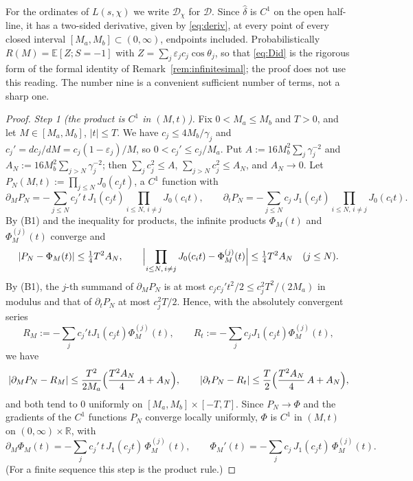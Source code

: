 \documentclass[11pt]{amsart}
\theoremstyle{definition}
\numberwithin{equation}{section}
\newcommand{\eps}{\varepsilon}
\newcommand{\EE}{\mathbb E}
\newcommand{\hd}{\widehat\delta}
\begin{document}
For the ordinates of $L(s,\chi)$ we write $\mathcal D_\chi$ for
$\mathcal D$. Since $\hd$ is $C^1$ on the open half-line, it has a
two-sided derivative, given by \eqref{eq:deriv}, at every point of
every closed interval $[M_a,M_b]\subset(0,\infty)$, endpoints
included. Probabilistically $R(M)=\EE[Z;S=-1]$ with
$Z=\sum_j\eps_jc_j\cos\theta_j$, so that \eqref{eq:Did} is the
rigorous form of the formal identity of
Remark~\ref{rem:infinitesimal}; the proof does not use this reading.
The number nine is a convenient sufficient number of terms, not a
sharp one.

\begin{proof}
\emph{Step 1 (the product is $C^1$ in $(M,t)$).} Fix $0<M_a\le M_b$
and $T>0$, and let $M\in[M_a,M_b]$, $|t|\le T$. We have
$c_j\le4M_b/\gamma_j$ and $c_j'=dc_j/dM=c_j(1-\eps_j)/M$, so
$0<c_j'\le c_j/M_a$. Put $A:=16M_b^2\sum_j\gamma_j^{-2}$ and
$A_N:=16M_b^2\sum_{j>N}\gamma_j^{-2}$; then $\sum_jc_j^2\le A$,
$\sum_{j>N}c_j^2\le A_N$, and $A_N\to0$. Let
$P_N(M,t):=\prod_{j\le N}J_0(c_jt)$, a $C^1$ function with
\[
\partial_MP_N=-\sum_{j\le N}c_j'\,t\,J_1(c_jt)\!\!\prod_{i\le N,\,i\ne j}\!\!J_0(c_it),
\qquad
\partial_tP_N=-\sum_{j\le N}c_j\,J_1(c_jt)\!\!\prod_{i\le N,\,i\ne j}\!\!J_0(c_it).
\]
By (B1) and the inequality for products, the infinite products
$\Phi_M(t)$ and $\Phi^{(j)}_M(t)$ converge and
\[
|P_N-\Phi_M(t)|\le\tfrac14T^2A_N,\qquad
\Bigl|\prod_{i\le N,\,i\ne j}J_0(c_it)-\Phi_M^{(j)}(t)\Bigr|\le\tfrac14T^2A_N
\quad(j\le N).
\]
By (B1), the $j$-th summand of $\partial_MP_N$ is at most
$c_jc_j't^2/2\le c_j^2T^2/(2M_a)$ in modulus and that of
$\partial_tP_N$ at most $c_j^2T/2$. Hence, with the absolutely
convergent series
\[
R_M:=-\sum_jc_j'tJ_1(c_jt)\Phi^{(j)}_M(t),\qquad
R_t:=-\sum_jc_jJ_1(c_jt)\Phi^{(j)}_M(t),
\]
we have
\[
|\partial_MP_N-R_M|\le\frac{T^2}{2M_a}\Bigl(\frac{T^2A_N}{4}\,A+A_N\Bigr),
\qquad
|\partial_tP_N-R_t|\le\frac{T}{2}\Bigl(\frac{T^2A_N}{4}\,A+A_N\Bigr),
\]
and both tend to $0$ uniformly on $[M_a,M_b]\times[-T,T]$. Since
$P_N\to\Phi$ and the gradients of the $C^1$ functions $P_N$ converge
locally uniformly, $\Phi$ is $C^1$ in $(M,t)$ on
$(0,\infty)\times\mathbb R$, with
\begin{equation}\label{eq:dPhi}
\partial_M\Phi_M(t)=-\sum_jc_j'\,t\,J_1(c_jt)\,\Phi_M^{(j)}(t),
\qquad
\Phi_M'(t)=-\sum_jc_j\,J_1(c_jt)\,\Phi_M^{(j)}(t).
\end{equation}
(For a finite sequence this step is the product rule.)


\end{proof}
\end{document}
